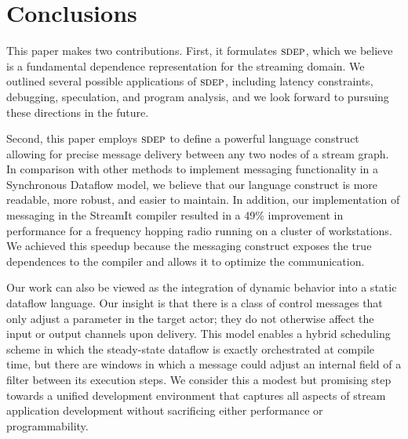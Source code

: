 \section{Conclusions}

This paper makes two contributions.  First, it formulates $\textsc{sdep}$,
which we believe is a fundamental dependence representation for the
streaming domain.  We outlined several possible applications of
$\textsc{sdep}$, including latency constraints, debugging, speculation, and
program analysis, and we look forward to pursuing these directions in
the future.

Second, this paper employs $\textsc{sdep}$ to define a powerful language
construct allowing for precise message delivery between any two nodes
of a stream graph.  In comparison with other methods to implement
messaging functionality in a Synchronous Dataflow model, we believe
that our language construct is more readable, more robust, and easier
to maintain.  In addition, our implementation of messaging in the
StreamIt compiler resulted in a 49\% improvement in performance for a
frequency hopping radio running on a cluster of workstations.  We
achieved this speedup because the messaging construct exposes the true
dependences to the compiler and allows it to optimize the
communication.

Our work can also be viewed as the integration of dynamic behavior
into a static dataflow language.  Our insight is that there is a class
of control messages that only adjust a parameter in the target actor;
they do not otherwise affect the input or output channels upon
delivery.  This model enables a hybrid scheduling scheme in which the
steady-state dataflow is exactly orchestrated at compile time, but
there are windows in which a message could adjust an internal field of
a filter between its execution steps.  We consider this a modest
but promising step towards a unified development environment that
captures all aspects of stream application development without
sacrificing either performance or programmability.
